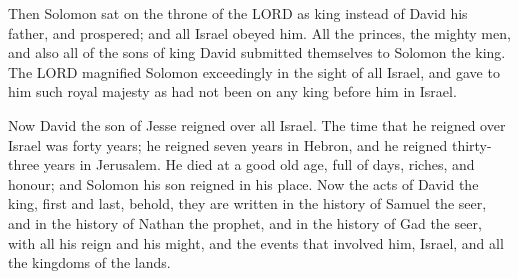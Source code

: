  Then Solomon sat on the throne of the LORD as king
instead of David his father, and prospered; and all Israel obeyed him.
 All the princes, the mighty men, and also all of the
sons of king David submitted themselves to Solomon the king.
 The LORD magnified Solomon exceedingly in the sight of
all Israel, and gave to him such royal majesty as had not been on any
king before him in Israel.

 Now David the son of Jesse reigned over all Israel.
 The time that he reigned over Israel was forty years; he
reigned seven years in Hebron, and he reigned thirty-three years in
Jerusalem.  He died at a good old age, full of days,
riches, and honour; and Solomon his son reigned in his place.
 Now the acts of David the king, first and last, behold,
they are written in the history of Samuel the seer, and in the history
of Nathan the prophet, and in the history of Gad the seer,
 with all his reign and his might, and the events that
involved him, Israel, and all the kingdoms of the lands.

